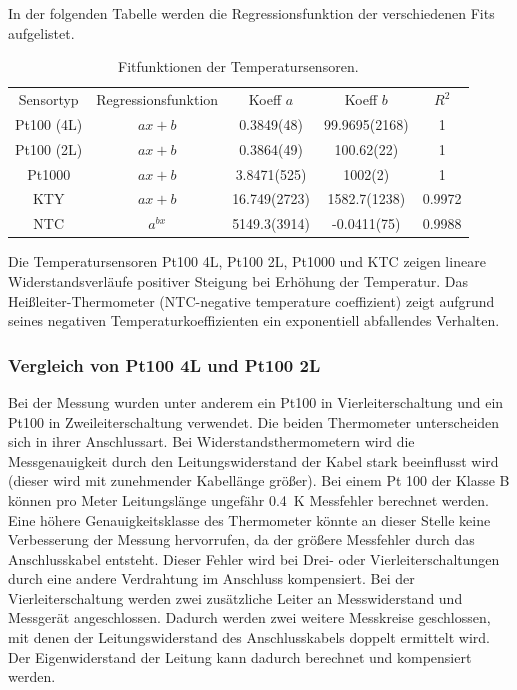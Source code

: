 In der folgenden Tabelle werden die Regressionsfunktion der verschiedenen Fits aufgelistet. 
\begin{table}[H]
	\centering
	\caption{Fitfunktionen der Temperatursensoren.}
	\label{tab:FitFun}
	\begin{tabular}{ccS[separate-uncertainty,table-parse-only,table-figures-uncertainty = 1]S[separate-uncertainty,table-parse-only,table-figures-uncertainty = 1]S}
		
		Sensortyp & Regressionsfunktion & {Koeff $a$} & {Koeff $b$} & {$R^2$} \\
		
		Pt100 (4L) & $ax+b$ & 0.3849(48) & 99.9695(2168) & 1 \\
		Pt100 (2L) & $ax+b$ & 0.3864(49) & 100.62(22) & 1 \\
		Pt1000 & $ax+b$ & 3.8471(525) & 1002(2) & 1 \\
		KTY & $ax+b$ & 16.749(2723) & 1582.7(1238) & 0.9972 \\
		NTC & $a^{bx}$ & 5149.3(3914) & -0.0411(75) & 0.9988 \\
		
	\end{tabular} 
\end{table}

Die Temperatursensoren Pt100 4L, Pt100 2L, Pt1000 und KTC zeigen lineare Widerstandsverläufe positiver Steigung bei Erhöhung der Temperatur. Das Heißleiter-Thermometer (NTC-negative temperature coeffizient) zeigt aufgrund seines negativen Temperaturkoeffizienten ein exponentiell abfallendes Verhalten. 

\subsubsection{Vergleich von Pt100 4L und Pt100 2L}

Bei der Messung wurden unter anderem ein Pt100 in Vierleiterschaltung und ein Pt100 in Zweileiterschaltung verwendet. Die beiden Thermometer unterscheiden sich in ihrer Anschlussart. Bei Widerstandsthermometern wird die Messgenauigkeit durch den Leitungswiderstand der Kabel stark beeinflusst wird (dieser wird mit zunehmender Kabellänge größer). Bei einem Pt 100 der Klasse B können pro Meter Leitungslänge ungefähr \SI{0,4}{\kelvin} Messfehler berechnet werden. Eine höhere Genauigkeitsklasse des Thermometer könnte an dieser Stelle keine Verbesserung der Messung hervorrufen, da der größere Messfehler durch das Anschlusskabel entsteht. 
Dieser Fehler wird bei Drei- oder Vierleiterschaltungen durch eine andere Verdrahtung im Anschluss kompensiert. Bei der Vierleiterschaltung werden zwei zusätzliche Leiter an Messwiderstand und Messgerät angeschlossen. Dadurch werden zwei weitere Messkreise geschlossen, mit denen der Leitungswiderstand des Anschlusskabels doppelt ermittelt wird. Der Eigenwiderstand der Leitung kann dadurch berechnet und kompensiert werden.

